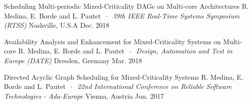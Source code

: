 



\begin{cvhonors}
	

\cvhonor
{Scheduling Multi-periodic Mixed-Criticality DAGs on Multi-core Architectures} 
{\newline
	R. Medina, E. Borde and L. Pautet $~\cdot~$ \textit{39th IEEE Real-Time 
		Systems Symposium (RTSS)} } %
{Nashville, U.S.A} %
{Dec. 2018} %


\cvhonor
{Availability Analysis and Enhancement for Mixed-Criticality Systems on 
	Multi-core} %
{\newline
	R. Medina, E. Borde and L. Pautet $~\cdot~$ \textit{Design, Automation and 
		Test in Europe (DATE)}} %
{Dresden, Germany} %
{Mar. 2018} %


\cvhonor
{Directed Acyclic Graph Scheduling for Mixed-Criticality Systems} %
{\newline
	R. Medina, E. Borde and L. Pautet $~\cdot~$ \textit{22nd International 
		Conference on Reliable Software Technologies - Ada-Europe}} %
{Vienna, Austria} %
{Jun. 2017} %

\end{cvhonors}

\newpage


